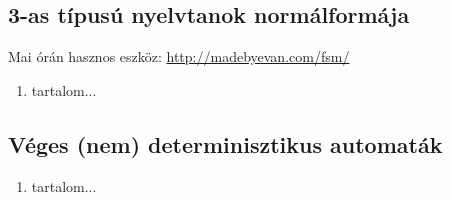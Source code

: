 \subsection{3-as típusú nyelvtanok normálformája}

Mai órán hasznos eszköz: \hyperlink{http://madebyevan.com/fsm/}{http://madebyevan.com/fsm/}
\begin{enumerate}
	\item tartalom...
\end{enumerate}

\subsection{Véges (nem) determinisztikus automaták}

\begin{enumerate}
	\item tartalom...
\end{enumerate}

\fi
